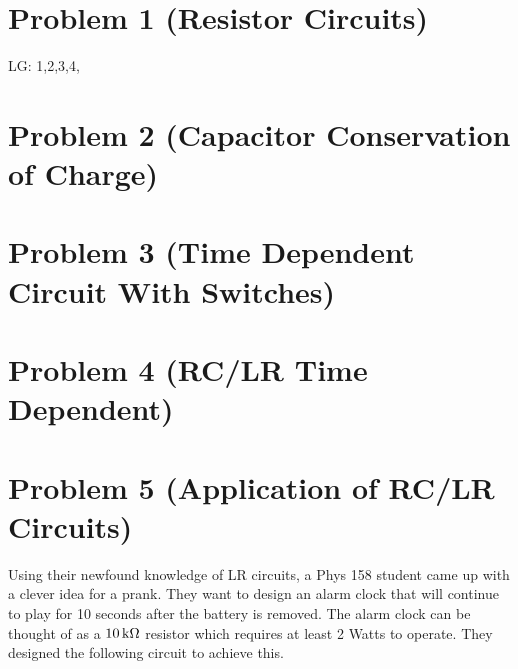 \documentclass[11pt, fleqn]{article}
\begin{document}
\section*{Problem 1 (Resistor Circuits)}
LG: 1,2,3,4,

\section*{Problem 2 (Capacitor Conservation of Charge)}

\section*{Problem 3 (Time Dependent Circuit With Switches)}

\section*{Problem 4 (RC/LR Time Dependent)}

\section*{Problem 5 (Application of RC/LR Circuits)}
Using their newfound knowledge of LR circuits, a Phys 158 student came up with a clever idea for a prank. They want to design an alarm clock that will continue to play for 10 seconds after the battery is removed. The alarm clock can be thought of as a $10\,\mathrm{k\Omega}$ resistor which requires at least 2 Watts to operate. They designed the following circuit to achieve this.
\end{document}
